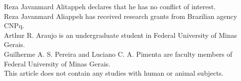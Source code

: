\documentclass[smallcondensed]{svjour3}
\begin{document}
Reza Javanmard Alitappeh declares that he has no conflict of interest.\\
Reza Javanmard Aliappeh has received research grants from Brazilian agency CNPq.\\
Arthur R. Araujo is an undergraduate student in Federal University of Minas Gerais.\\
Guilherme A. S. Pereira  and Luciano C. A. Pimenta are faculty members of Federal University of Minas Gerais.\\
This article does not contain any studies with human or animal subjects.


 
\end{document}
